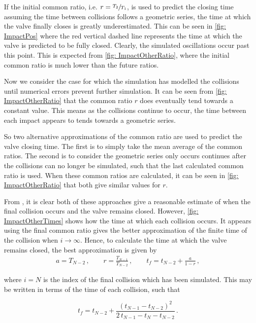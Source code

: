 If the initial common ratio, i.e. $r = \sfrac{T_2}{T_1}$, is used to predict the closing time assuming the time between collisions follows a geometric series, the time at which the valve finally closes is greatly underestimated. This can be seen in \cref{fig: ImpactPos} where the red vertical dashed line represents the time at which the valve is predicted to be fully closed. Clearly, the simulated oscillations occur past this point. This is expected from \cref{fig: ImpactOtherRatio}, where the initial common ratio is much lower than the future ratios.

Now we consider the case for which the simulation has modelled the collisions until numerical errors prevent further simulation. It can be seen from \cref{fig: ImpactOtherRatio} that the common ratio $r$ does eventually tend towards a constant value. This means as the collisions continue to occur, the time between each impact appears to tends towards a geometric series. 

So two alternative approximations of the common ratio are used to predict the valve closing time. The first is to simply take the mean average of the common ratios. The second is to consider the geometric series only occurs continues after the collisions can no longer be simulated, such that the last calculated common ratio is used.%
When these common ratios are calculated, it can be seen in \cref{fig: ImpactOtherRatio} that both give similar values for $r$.

From , it is clear both of these approaches give a reasonable estimate of when the final collision occurs and the valve remains closed. However, \cref{fig: ImpactOtherTimes} shows how the time at which each collision occurs. It appears using the final common ratio gives the better approximation of the finite time of the collision when $i \rightarrow \infty$. Hence, to calculate the time at which the valve remains closed, the best approximation is given by
~
\begin{equation*}
\begin{split}
    a = T_{N-2} \, , \qquad %
    r = \frac{T_{N-1}}{T_{N-2}} \, , \qquad %
    t_f = t_{N-2} + \frac{a}{1-r} \, ,
\end{split}
\end{equation*}

where $i = N$ is the index of the final collision which has been simulated. This may be written in terms of the time of each collision, such that

\begin{equation*}
    t_f = t_{N-2} + \frac{\left( t_{N-1} - t_{N-2} \right)^2}{2 \, t_{N-1} - t_N - t_{N-2}} \, .
\end{equation*}